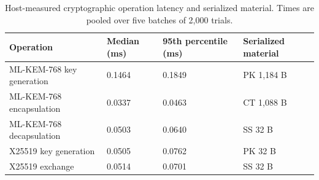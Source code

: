 \begin{table}[!ht]
\caption{Host-measured cryptographic operation latency and serialized material. Times are pooled over five batches of 2,000 trials.}
\label{tab:kem}
\centering
\setlength{\tabcolsep}{2pt}
\begin{tabular}{|p{}|p{}|p{}|p{}|}
\hline
Operation & Median (ms) & 95th percentile (ms) & Serialized material \\
\hline
ML-KEM-768 key generation & 0.1464 & 0.1849 & PK 1,184 B \\
\hline
ML-KEM-768 encapsulation & 0.0337 & 0.0463 & CT 1,088 B \\
\hline
ML-KEM-768 decapsulation & 0.0503 & 0.0640 & SS 32 B \\
\hline
X25519 key generation & 0.0505 & 0.0762 & PK 32 B \\
\hline
X25519 exchange & 0.0514 & 0.0701 & SS 32 B \\
\hline
\end{tabular}
\end{table}
